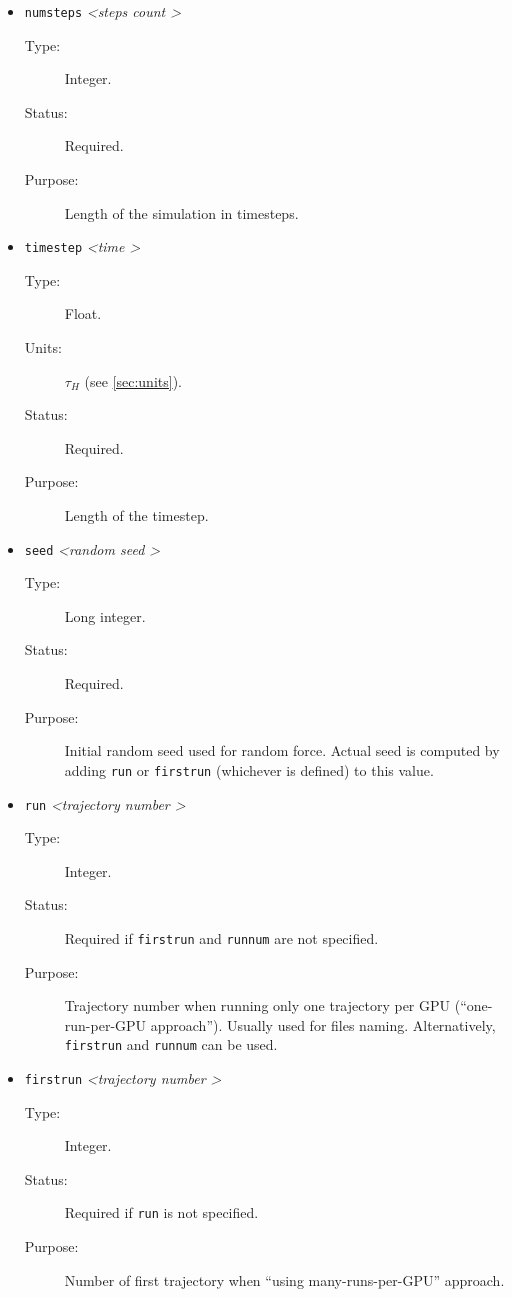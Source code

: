 \documentclass[a4paper]{article}
\begin{document}
\begin{itemize}
\item \texttt{numsteps} \textit{\textless steps count \textgreater}
\begin{description}
\item[Type:] Integer.
\item[Status:] Required.
\item[Purpose:] Length of the simulation in timesteps.
\end{description}

\item \texttt{timestep} \textit{\textless time \textgreater}
\begin{description}
\item[Type:] Float.
\item[Units:] $\tau_H$ (see \ref{sec:units}).
\item[Status:] Required.
\item[Purpose:] Length of the timestep.
\end{description}

\item \texttt{seed} \textit{\textless random seed \textgreater}
\begin{description}
\item[Type:] Long integer.
\item[Status:] Required.
\item[Purpose:] Initial random seed used for random force. Actual seed is computed by adding \texttt{run} or \texttt{firstrun} (whichever is defined) to this value.
\end{description}

\item \texttt{run} \textit{\textless trajectory number \textgreater}
\begin{description}
\item[Type:] Integer.
\item[Status:] Required if \texttt{firstrun} and \texttt{runnum} are not specified. 
\item[Purpose:] Trajectory number when running only one trajectory per GPU (``one-run-per-GPU approach''). Usually used for files naming. Alternatively, \texttt{firstrun} and \texttt{runnum} can be used.
\end{description}

\item \texttt{firstrun} \textit{\textless trajectory number \textgreater}
\begin{description}
\item[Type:] Integer.
\item[Status:] Required if \texttt{run} is not specified. 
\item[Purpose:] Number of first trajectory when ``using many-runs-per-GPU'' approach.
\end{description}


\end{itemize}
\end{document}
